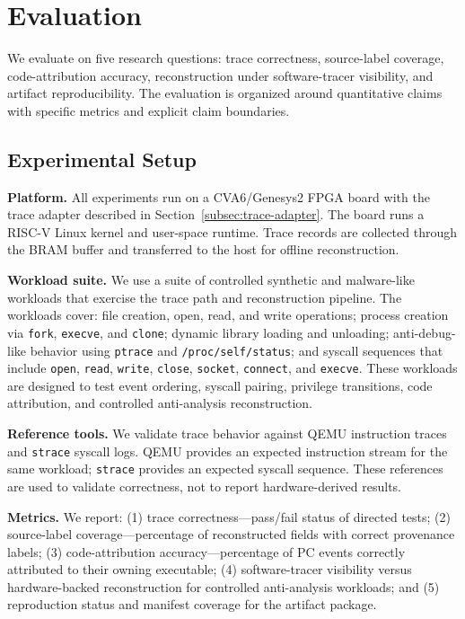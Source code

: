 \section{Evaluation}
\label{sec:evaluation}

We evaluate \rvmt on five research questions: trace correctness, source-label
coverage, code-attribution accuracy, reconstruction under software-tracer
visibility, and artifact reproducibility. The evaluation is organized around
quantitative claims with specific metrics and explicit claim boundaries.

\subsection{Experimental Setup}
\label{subsec:experimental-setup}

\textbf{Platform.}
All experiments run on a CVA6/Genesys2 FPGA board with the trace adapter described in Section~\ref{subsec:trace-adapter}. The board runs a RISC-V Linux kernel and user-space runtime. Trace records are collected through the BRAM buffer and transferred to the host for offline reconstruction.

\textbf{Workload suite.}
We use a suite of controlled synthetic and malware-like workloads that exercise
the trace path and reconstruction pipeline. The workloads cover: file creation,
open, read, and write operations; process creation via \texttt{fork},
\texttt{execve}, and \texttt{clone}; dynamic library loading and unloading;
anti-debug-like behavior using \texttt{ptrace} and \texttt{/proc/self/status};
and syscall sequences that include \texttt{open}, \texttt{read}, \texttt{write},
\texttt{close}, \texttt{socket}, \texttt{connect}, and \texttt{execve}. These
workloads are designed to test event ordering, syscall pairing, privilege
transitions, code attribution, and controlled anti-analysis reconstruction.

\textbf{Reference tools.}
We validate trace behavior against QEMU instruction traces and \texttt{strace} syscall logs. QEMU provides an expected instruction stream for the same workload; \texttt{strace} provides an expected syscall sequence. These references are used to validate correctness, not to report hardware-derived results.

\textbf{Metrics.}
We report: (1) trace correctness---pass/fail status of directed tests; (2)
source-label coverage---percentage of reconstructed fields with correct
provenance labels; (3) code-attribution accuracy---percentage of PC events
correctly attributed to their owning executable; (4) software-tracer visibility
versus hardware-backed reconstruction for controlled anti-analysis workloads;
and (5) reproduction status and manifest coverage for the artifact package.

